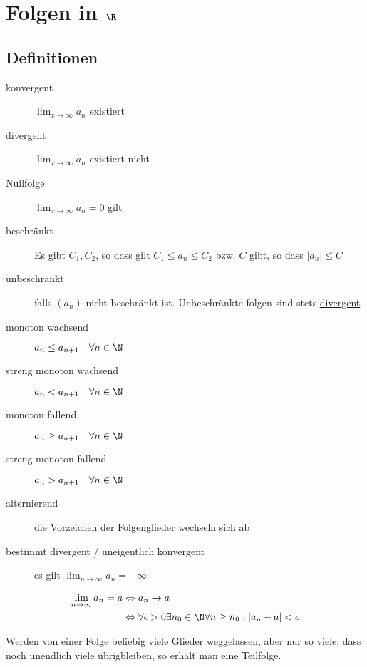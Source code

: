 \section{Folgen in $\R$}

\subsection{Definitionen}
\begin{description}
  \item[konvergent] $\lim_{x \to \infty} a_n$ existiert 
  \item[divergent] $\lim_{x \to \infty} a_n$ existiert nicht 
  \item[Nullfolge] $\lim_{x \to \infty} a_n = 0$ gilt 
  \item[beschränkt] Es gibt $C_1, C_2$, so dass gilt $C_1 \leq a_n \leq C_2$
  bzw. $C$ gibt, so dass $|a_n| \leq C$
  \item[unbeschränkt] falls $(a_n)$ nicht beschränkt ist. Unbeschränkte folgen
  sind stets \underline{divergent}
  \item[monoton wachsend] $a_n \leq a_{n+1} \quad \forall n \in \N$ 
  \item[streng monoton wachsend] $a_n < a_{n+1} \quad \forall n \in \N$
  \item[monoton fallend] $a_n \geq a_{n+1} \quad \forall n \in \N$
  \item[streng monoton fallend] $a_n > a_{n+1} \quad \forall n \in \N$
  \item[alternierend] die Vorzeichen der Folgenglieder wechseln sich ab
  \item[bestimmt divergent / uneigentlich konvergent] es gilt $\lim_{n \to
  \infty} a_n = \pm \infty$
\end{description}

\begin{definition}[Grenzwert] 
	\begin{align*}
		\lim_{n \to \infty} a_n = a & \Leftrightarrow a_n \to a \\
		& \Leftrightarrow \forall \epsilon > 0 \exists n_0 \in \N \forall n \geq n_0:
		|a_n - a| < \epsilon
	\end{align*}
\end{definition}

\begin{definition}[Teilfolge] 
Werden von einer Folge beliebig viele Glieder weggelassen, aber nur so viele,
dass noch unendlich viele übrigbleiben, so erhält man eine Teilfolge.
\end{definition}

